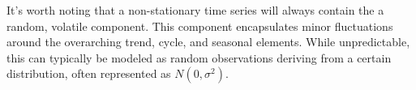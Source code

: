 \documentclass[10pt]{article}
\begin{document}





It's worth noting that a non-stationary time series will always contain the a random, volatile component. This component encapsulates minor fluctuations around the overarching trend, cycle, and seasonal elements. While unpredictable, this can typically be modeled as random observations deriving from a certain distribution, often represented as \(N(0,\sigma^2)\).
\end{document}
